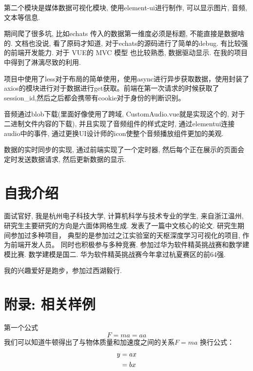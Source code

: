 \documentclass[UTF8]{ctexart}
\begin{document}
第二个模块是媒体数据可视化模块, 使用element-ui进行制作, 可以显示图片, 音频, 文本等信息. 

期间爬了很多坑, 比如echats 传入的数据第一维度必须是标题, 不能直接是数据啥的. 文档也没说, 看了原码才知道, 对于echats的源码进行了简单的debug. 有比较强的前端开发能力. 对于 VUE的  MVC 模型 也比较熟悉, 数据驱动显示. 在我的项目中得到了淋漓尽致的利用. 

项目中使用了less对于布局的简单使用，使用async进行异步获取数据，使用封装了axios的模块进行对于数据进行get获取。前端在第一次请求的时候获取了session\_id,然后之后都会携带有cookie对于身份的判断识别。

音频通过blob下载(里面好像使用了跨域, CustomAudio.vue就是实现这个的, 对于二进制文件内容的下载), 并且实现了音频组件的样式定时, 通过elementui连接audio中的事件,  通过更换UI设计师的icon使整个音频播放组件更加的美观.

数据的实时同步的实现, 通过前端实现了一个定时器, 然后每个正在展示的页面会定时发送数据请求, 然后更新数据的显示.
\section{自我介绍}
面试官好, 我是杭州电子科技大学, 计算机科学与技术专业的学生, 来自浙江温州,
研究生主要研究的方向是六面体网格生成. 发表了一篇中文核心的论文.
研究生期间参加过多种项目， 典型的是参加过之江实验室的天枢深度学习可视化的项目, 作为前端开发人员。
同时也积极参与多种竞赛. 参加过华为软件精英挑战赛和数学建模比赛. 数学建模是国二. 华为软件精英挑战赛今年拿过杭夏赛区的前64强. \par
我的兴趣爱好是跑步，参加过西湖毅行.

	\section{附录: 相关样例}
	第一个公式
	\begin{equation}
		F=ma=aa
	\end{equation}
	我们可以知道牛顿得出了与物体质量和加速度之间的关系$F=ma$
	换行公式：
	\begin{align}
		y &=ax\notag\\
		&=bx
	\end{align}
	
\end{document}
